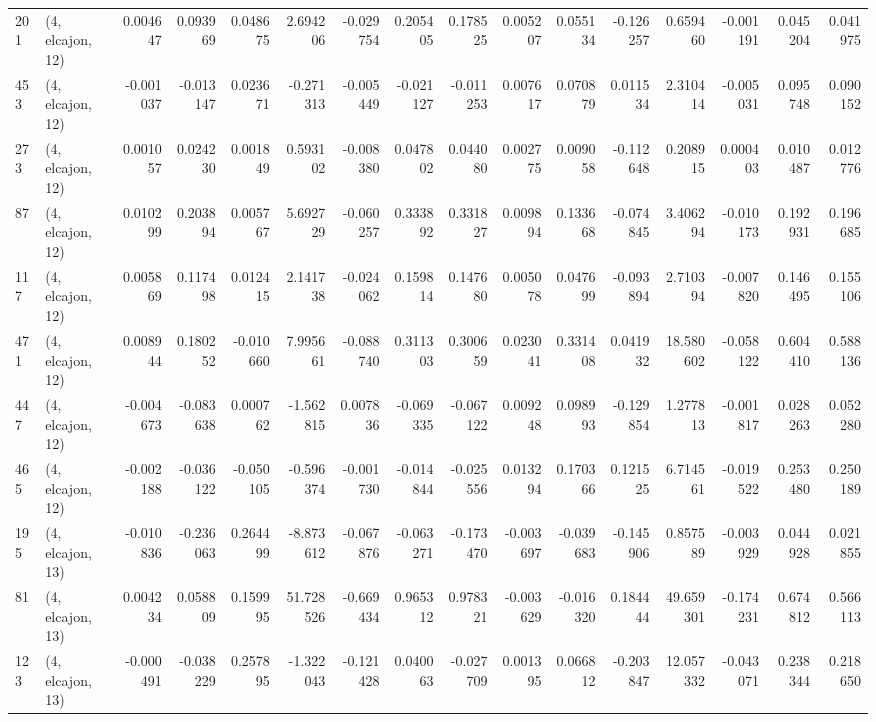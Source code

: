 \begin{tabular}{llrrrrrrrrrrrrrr}
201 &  (4, elcajon, 12) &   0.004647 &  0.093969 &  0.048675 &    2.694206 & -0.029754 &   0.205405 &  0.178525 &  0.005207 &  0.055134 & -0.126257 &     0.659460 & -0.001191 &  0.045204 &  0.041975 \\
453 &  (4, elcajon, 12) &  -0.001037 & -0.013147 &  0.023671 &   -0.271313 & -0.005449 &  -0.021127 & -0.011253 &  0.007617 &  0.070879 &  0.011534 &     2.310414 & -0.005031 &  0.095748 &  0.090152 \\
273 &  (4, elcajon, 12) &   0.001057 &  0.024230 &  0.001849 &    0.593102 & -0.008380 &   0.047802 &  0.044080 &  0.002775 &  0.009058 & -0.112648 &     0.208915 &  0.000403 &  0.010487 &  0.012776 \\
87  &  (4, elcajon, 12) &   0.010299 &  0.203894 &  0.005767 &    5.692729 & -0.060257 &   0.333892 &  0.331827 &  0.009894 &  0.133668 & -0.074845 &     3.406294 & -0.010173 &  0.192931 &  0.196685 \\
117 &  (4, elcajon, 12) &   0.005869 &  0.117498 &  0.012415 &    2.141738 & -0.024062 &   0.159814 &  0.147680 &  0.005078 &  0.047699 & -0.093894 &     2.710394 & -0.007820 &  0.146495 &  0.155106 \\
471 &  (4, elcajon, 12) &   0.008944 &  0.180252 & -0.010660 &    7.995661 & -0.088740 &   0.311303 &  0.300659 &  0.023041 &  0.331408 &  0.041932 &    18.580602 & -0.058122 &  0.604410 &  0.588136 \\
447 &  (4, elcajon, 12) &  -0.004673 & -0.083638 &  0.000762 &   -1.562815 &  0.007836 &  -0.069335 & -0.067122 &  0.009248 &  0.098993 & -0.129854 &     1.277813 & -0.001817 &  0.028263 &  0.052280 \\
465 &  (4, elcajon, 12) &  -0.002188 & -0.036122 & -0.050105 &   -0.596374 & -0.001730 &  -0.014844 & -0.025556 &  0.013294 &  0.170366 &  0.121525 &     6.714561 & -0.019522 &  0.253480 &  0.250189 \\
195 &  (4, elcajon, 13) &  -0.010836 & -0.236063 &  0.264499 &   -8.873612 & -0.067876 &  -0.063271 & -0.173470 & -0.003697 & -0.039683 & -0.145906 &     0.857589 & -0.003929 &  0.044928 &  0.021855 \\
81  &  (4, elcajon, 13) &   0.004234 &  0.058809 &  0.159995 &   51.728526 & -0.669434 &   0.965312 &  0.978321 & -0.003629 & -0.016320 &  0.184444 &    49.659301 & -0.174231 &  0.674812 &  0.566113 \\
123 &  (4, elcajon, 13) &  -0.000491 & -0.038229 &  0.257895 &   -1.322043 & -0.121428 &   0.040063 & -0.027709 &  0.001395 &  0.066812 & -0.203847 &    12.057332 & -0.043071 &  0.238344 &  0.218650 \\

\end{tabular}
